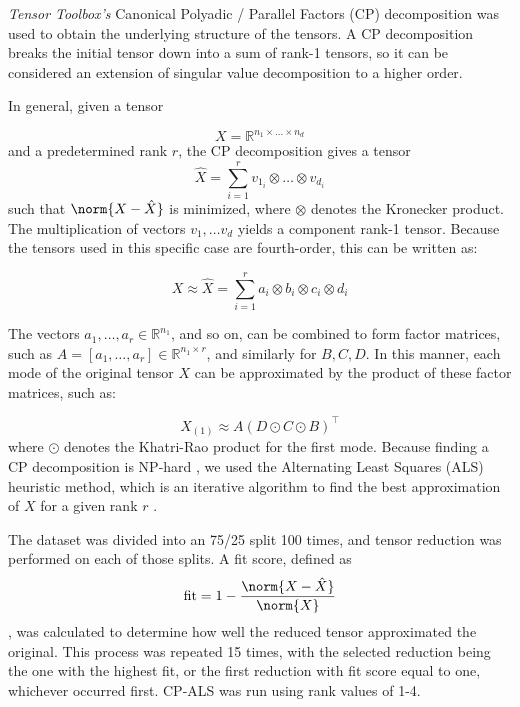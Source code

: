 \textit{Tensor Toolbox's} \cite{tensor_toolbox_gitlab} Canonical Polyadic / Parallel Factors (CP) decomposition \cite{kolda_tensors} was used to obtain the underlying structure of the tensors. A CP decomposition breaks the initial tensor down into a sum of rank-1 tensors, so it can be considered an extension of singular value decomposition to a higher order. 

In general, given a tensor

\begin{equation*}
    X = \mathbb{R}^{n_1 \times \dots \times n_d}
\end{equation*}
and a predetermined rank $r$, the CP decomposition gives a tensor
\begin{equation*}
    \hat{X} = \sum^{r}_{i=1} v_{1_{i}} \otimes \dots \otimes v_{d_{i}}
\end{equation*}
such that $\norm{X - \hat{X}}$ is minimized, where $\otimes$ denotes the Kronecker product. The multiplication of vectors $v_1, \dots v_d$ yields a component rank-1 tensor. Because the tensors used in this specific case are fourth-order, this can be written as:

\begin{equation*}
    X \approx \hat{X} = \sum^{r}_{i=1} a_i \otimes b_i \otimes c_i \otimes d_i
\end{equation*}

The vectors $a_1,\dots,a_r\in\mathbb{R}^{n_1}$, and so on, can be combined to form factor matrices, such as $A = [a_1, \dots, a_r]\in\mathbb{R}^{n_1\times r}$, and similarly for $B, C, D$. In this manner, each mode of the original tensor $X$ can be approximated by the product of these factor matrices, such as:

\begin{equation*}
    X_{(1)} \approx A \left( D \odot C \odot B \right)^{\top}
\end{equation*}
where $\odot$ denotes the Khatri-Rao product for the first mode. Because finding a CP decomposition is NP-hard \cite{hillar_most_2013}, we used the Alternating Least Squares (ALS) heuristic method, which is an iterative algorithm to find the best approximation of $X$ for a given rank $r$ \cite{kolda_tensors}.

The dataset was divided into an 75/25 split 100 times, and tensor reduction was performed on each of those splits. A fit score, defined as
\begin{equation*}
    \mathrm{fit} = 1 - \frac{\norm{X - \hat{X}}}{\norm{X}}
\end{equation*}
, was calculated to determine how well the reduced tensor approximated the original. This process was repeated 15 times, with the selected reduction being the one with the highest fit, or the first reduction with fit score equal to one, whichever occurred first. CP-ALS was run using rank values of 1-4.  

